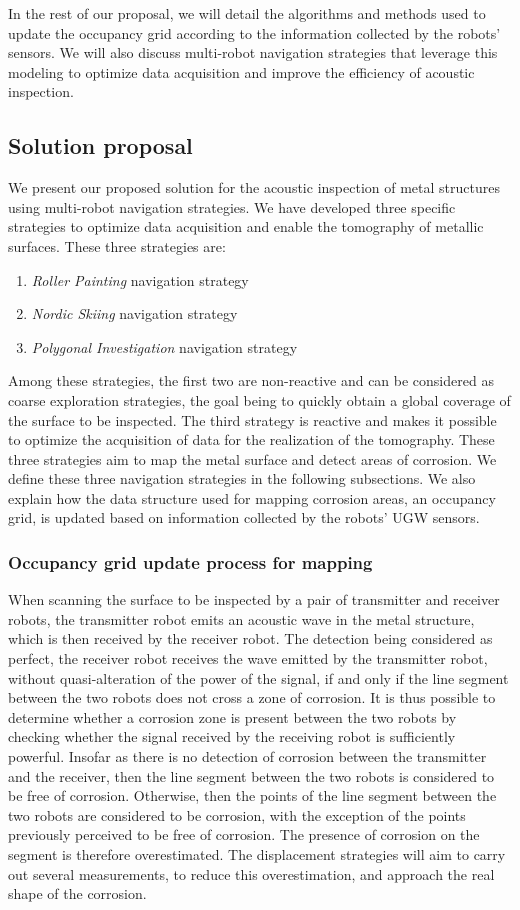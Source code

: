 \documentclass[english,RandD]{rapportPFE}  %
\begin{document}
			In the rest of our proposal, we will detail the algorithms and methods used to update the occupancy grid according to the information collected by the robots' sensors.
			We will also discuss multi-robot navigation strategies that leverage this modeling to optimize data acquisition and improve the efficiency of acoustic inspection.
		\subsection{Solution proposal}
			We present our proposed solution for the acoustic inspection of metal structures using multi-robot navigation strategies.
			We have developed three specific strategies to optimize data acquisition and enable the tomography of metallic surfaces.
			These three strategies are:
			\begin{enumerate}
				\item \textit{Roller Painting} navigation strategy
				\item \textit{Nordic Skiing} navigation strategy
				\item \textit{Polygonal Investigation} navigation strategy
			\end{enumerate}
			Among these strategies, the first two are non-reactive and can be considered as coarse exploration strategies, the goal being to quickly obtain a global coverage of the surface to be inspected.
			The third strategy is reactive and makes it possible to optimize the acquisition of data for the realization of the tomography.
			These three strategies aim to map the metal surface and detect areas of corrosion.
			We define these three navigation strategies in the following subsections.
			We also explain how the data structure used for mapping corrosion areas, an occupancy grid, is updated based on information collected by the robots' UGW sensors.
			\subsubsection*{Occupancy grid update process for mapping}
				When scanning the surface to be inspected by a pair of transmitter and receiver robots, the transmitter robot emits an acoustic wave in the metal structure, which is then received by the receiver robot.
				The detection being considered as perfect, the receiver robot receives the wave emitted by the transmitter robot, without quasi-alteration of the power of the signal, if and only if the line segment between the two robots does not cross a zone of corrosion.
				It is thus possible to determine whether a corrosion zone is present between the two robots by checking whether the signal received by the receiving robot is sufficiently powerful.
				Insofar as there is no detection of corrosion between the transmitter and the receiver, then the line segment between the two robots is considered to be free of corrosion.
				Otherwise, then the points of the line segment between the two robots are considered to be corrosion, with the exception of the points previously perceived to be free of corrosion.
				The presence of corrosion on the segment is therefore overestimated.
				The displacement strategies will aim to carry out several measurements, to reduce this overestimation, and approach the real shape of the corrosion.
\end{document}
